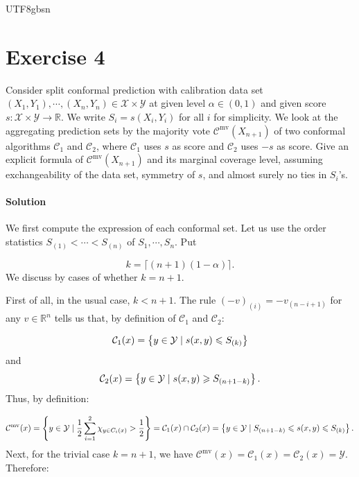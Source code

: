 \documentclass[../../main.tex]{subfiles}
\begin{document}
\begin{CJK*}{UTF8}{gbsn}

\section*{Exercise 4}
Consider split conformal prediction 
with calibration data set $(X_1, Y_1), \cdots, (X_{n}, Y_{n}) 
\in \mathcal{X} \times \mathcal{Y}$ 
at given level $\alpha \in (0,1)$
and given score 
$s : \mathcal{X} \times \mathcal{Y} \to \mathbb{R}$.
We write $S_i = s(X_i, Y_i)$ for all $i$ for simplicity.
We look at the aggregating prediction sets by the majority vote 
$\mathcal{C}^{\text{mv}}(X_{n+1})$
of two conformal algorithms $\mathcal{C}_1$ and $\mathcal{C}_2$,
where $\mathcal{C}_1$ uses $s$ as score and 
$\mathcal{C}_2$ uses $-s$ as score.
Give an explicit formula of $\mathcal{C}^{\text{mv}}(X_{n+1})$
and its marginal coverage level, assuming exchangeability of the data set,
symmetry of $s$, and almost surely no 
ties in $S_i$'s.

\paragraph{Solution}
We first compute the expression of each conformal set.
Let us use the order statistics $S_{(1)} < \cdots < S_{(n)}$
of $S_1, \cdots, S_n$. 
Put 

\begin{equation*}
    k=\lceil(n+1)(1-\alpha)\rceil.
\end{equation*}
We discuss by cases of whether $k = n + 1$.

First of all, in the usual case, $ k < n + 1$.
The rule $(-v)_{(i)} = - v_{(n-i+1)}$ for any $v \in \mathbb{R}^n$
tells us that, by definition of $\mathcal{C}_1$ and $\mathcal{C}_2$:

\begin{equation*}
    \mathcal{C}_1(x)=\left \{ y \in \mathcal{Y} \mid s(x,y) \leqslant S_{(k)}  \right \}
\end{equation*}
and 
\begin{equation*}
    \mathcal{C}_2(x)=\left \{ y \in \mathcal{Y} \mid s(x,y) \geqslant S_{(n+1-k)} \right \}.
\end{equation*}
Thus, by definition:

\begin{equation*}
    \mathcal{C}^{\text{mv}}(x)
    = \left \{ y\in \mathcal{Y} \mid 
    \frac{1}{2} \sum_{i=1}^2 \chi_{y \in C_i(x)} > \frac{1}{2} \right \} 
    =\mathcal{C}_1(x)\cap\mathcal{C}_2(x)
    =\left \{ y\in \mathcal{Y} \mid S_{(n+1-k)}\leqslant s(x,y)\leqslant S_{(k)} \right \}.
\end{equation*}
Next, for the trivial case $k = n + 1$, we have
$\mathcal{C}^{\text{mv}}(x)=\mathcal{C}_1(x)=\mathcal{C}_2(x)=\mathcal{Y}$.
Therefore:


\end{CJK*}
\end{document}
